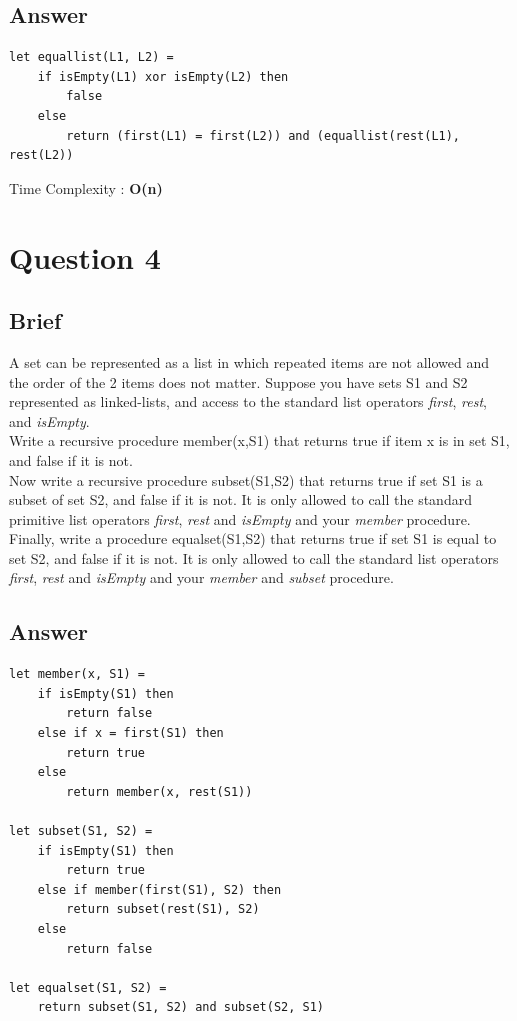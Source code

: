 \documentclass{article}
\begin{document}
\subsection{Answer}
\begin{lstlisting}
let equallist(L1, L2) =
    if isEmpty(L1) xor isEmpty(L2) then
        false
    else
        return (first(L1) = first(L2)) and (equallist(rest(L1), rest(L2))
\end{lstlisting}
Time Complexity : \textbf{O(n)}

\section{Question 4}
\subsection{Brief}
A set can be represented as a list in which repeated items are not allowed and the order of the 2 items does not matter. Suppose you have sets S1 and S2 represented as linked-lists, and access to the standard list operators \textit{first}, \textit{rest}, and \textit{isEmpty}. 
\\ \newline
Write a recursive procedure member(x,S1) that returns true if item x is in set S1, and false if it is not.
\\ \newline
Now write a recursive procedure subset(S1,S2) that returns true if set S1 is a subset of set S2, and false if it is not.  It is only allowed to call the standard primitive list operators \textit{first}, \textit{rest} and \textit{isEmpty} and your \textit{member} procedure.
\\ \newline
Finally, write a procedure equalset(S1,S2) that returns true if set S1 is equal to set S2, and false if it is not.  It is only allowed to call the standard list operators \textit{first}, \textit{rest} and \textit{isEmpty} and your \textit{member} and \textit{subset} procedure.
\subsection{Answer}
\begin{lstlisting}
let member(x, S1) =
    if isEmpty(S1) then
        return false
    else if x = first(S1) then
        return true
    else
        return member(x, rest(S1))
        
let subset(S1, S2) = 
    if isEmpty(S1) then
        return true
    else if member(first(S1), S2) then
        return subset(rest(S1), S2)
    else
        return false
        
let equalset(S1, S2) = 
    return subset(S1, S2) and subset(S2, S1)
\end{lstlisting}
\end{document}
